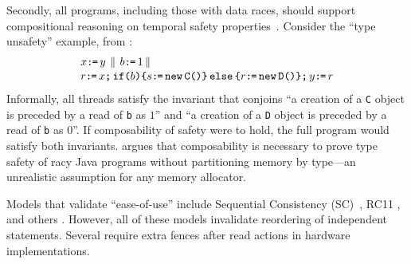 Secondly, all programs, including those with data races,  should support compositional reasoning on temporal safety properties~\cite{PnueliSafety,Misra:1981:PNP:1313338.1313770,StarkSafety,Abadi:1993:CS:151646.151649}.
Consider the ``type unsafety'' example, from
\citep[Figure 8]{DBLP:journals/toplas/Lochbihler13}:
\begin{align*}
  &x\texttt{:}\mkern-1mu\texttt{=}\, y
    \,\mathbin{\|}\,
    b \texttt{:}\mkern-1mu\texttt{=}\, 1   
    \,\mathbin{\|}\,\\[-.5ex]&
    r\texttt{:}\mkern-1mu\texttt{=}\, x \texttt{;}\,\allowbreak \texttt{if}\allowbreak\texttt{(}b\texttt{)} \allowbreak\texttt{\{} s \texttt{:}\mkern-1mu\texttt{=}\, \texttt{new}\, \texttt{C()} \texttt{\}}\,\allowbreak\texttt{else}\allowbreak\,\texttt{\{} r \texttt{:}\mkern-1mu\texttt{=}\, \texttt{new}\, \texttt{D()} \texttt{\}}  \texttt{;}\,\allowbreak y \texttt{:}\mkern-1mu\texttt{=}\, r 
\end{align*}
Informally, all threads satisfy the invariant that conjoins ``a creation of a \texttt{C} object is preceded by a read of \texttt{b} as $1$'' and ``a creation of a \texttt{D} object is preceded by a read of \texttt{b} as $0$''.  If composability of safety were to hold, the full program would satisfy both invariants.
\citeauthor{DBLP:journals/toplas/Lochbihler13} argues that composability is necessary to prove type safety of racy Java programs without partitioning memory by type---an unrealistic assumption for any memory allocator. %

Models that validate ``ease-of-use'' include Sequential Consistency (SC)~\citep{Lamport:1979:MMC:1311099.1311750}, RC11 \citep{DBLP:conf/pldi/LahavVKHD17}, and others \citep{Dolan:2018:BDR:3192366.3192421,DBLP:conf/pldi/LahavVKHD17,DBLP:conf/lics/JeffreyR16,BoehmOOTA}.  However, all of these models invalidate reordering of independent statements.  Several require extra fences after read actions in hardware implementations. %


